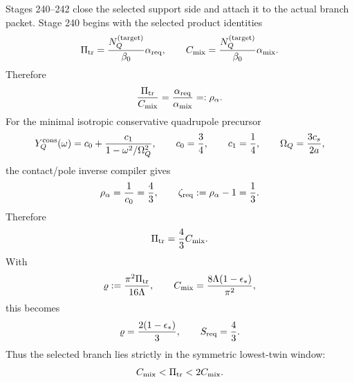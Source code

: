 Stages 240--242 close the selected support side and attach it to the actual branch packet.  Stage 240 begins with the selected product identities
\begin{equation}
\label{eq:app-part07-selected-product-identities}
\Pi_{\rm tr}=\frac{N_Q^{(\rm target)}}{\beta_0}\alpha_{\rm req},
\qquad
C_{\rm mix}=\frac{N_Q^{(\rm target)}}{\beta_0}\alpha_{\rm mix}.
\end{equation}
Therefore
\begin{equation}
\label{eq:app-part07-rho-alpha-ratio}
\frac{\Pi_{\rm tr}}{C_{\rm mix}}
=\frac{\alpha_{\rm req}}{\alpha_{\rm mix}}
=:\rho_\alpha.
\end{equation}
For the minimal isotropic conservative quadrupole precursor
\begin{equation}
\label{eq:app-part07-minimal-quadrupole-precursor}
Y_Q^{\rm cons}(\omega)
=c_0+\frac{c_1}{1-\omega^2/\Omega_Q^2},
\qquad
c_0=\frac34,
\qquad
c_1=\frac14,
\qquad
\Omega_Q=\frac{3c_s}{2a},
\end{equation}
the contact/pole inverse compiler gives
\begin{equation}
\label{eq:app-part07-rho-alpha-zeta-req}
\rho_\alpha=\frac1{c_0}=\frac43,
\qquad
\zeta_{\rm req}:=\rho_\alpha-1=\frac13.
\end{equation}
Therefore
\begin{equation}
\label{eq:app-part07-pi-tr-four-thirds}
\Pi_{\rm tr}=\frac43 C_{\rm mix}.
\end{equation}
With
\begin{equation}
\label{eq:app-part07-varrho-selector}
\varrho:=\frac{\pi^2\Pi_{\rm tr}}{16\Lambda},
\qquad
C_{\rm mix}=\frac{8\Lambda(1-\epsilon_*)}{\pi^2},
\end{equation}
this becomes
\begin{equation}
\label{eq:app-part07-varrho-selected}
\varrho=\frac{2(1-\epsilon_*)}{3},
\qquad
S_{\rm req}=\frac43.
\end{equation}
Thus the selected branch lies strictly in the symmetric lowest-twin window:
\begin{equation}
\label{eq:app-part07-twin-window}
C_{\rm mix}<\Pi_{\rm tr}<2C_{\rm mix}.
\end{equation}

